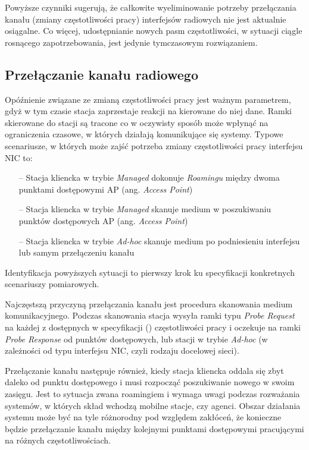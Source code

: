 Powyższe czynniki sugerują, że całkowite wyeliminowanie potrzeby przełączania kanału (zmiany częstotliwości pracy) interfejsów radiowych nie jest aktualnie osiągalne. Co więcej, udostępnianie nowych pasm częstotliwości, w sytuacji ciągle rosnącego zapotrzebowania, jest jedynie tymczasowym rozwiązaniem.  


\subsection{Przełączanie kanału radiowego}
Opóźnienie związane ze zmianą częstotliwości pracy jest ważnym parametrem, gdyż w tym czasie stacja zaprzestaje reakcji na kierowane do niej dane. Ramki skierowane do stacji są tracone co w oczywisty sposób może wpłynąć na ograniczenia czasowe, w których działają komunikujące się systemy. 
Typowe scenariusze, w których może zajść potrzeba zmiany częstotliwości pracy interfejsu NIC to:
\begin{itemize}
\item[--] Stacja kliencka w trybie \emph{Managed} dokonuje \emph{Roamingu} między dwoma punktami dostępowymi AP (ang. \emph{Access Point}) 
\item[--] Stacja kliencka w trybie \emph{Managed} skanuje medium w poszukiwaniu punktów dostępowych AP (ang. \emph{Access Point})
\item[--] Stacja kliencka w trybie \emph{Ad-hoc} skanuje medium po podniesieniu interfejsu lub samym przełączeniu kanału 
\end{itemize}
Identyfikacja powyższych sytuacji to pierwszy krok ku specyfikacji konkretnych scenariuszy pomiarowych. 

Najczęstszą przyczyną przełączania kanału jest procedura skanowania medium komunikacyjnego. Podczas skanowania stacja wysyła ramki typu \emph{Probe Request} na każdej z dostępnych w specyfikacji (\cite{std:IEEE80211}) częstotliwości pracy i oczekuje na ramki \emph{Probe Response} od punktów dostępowych, lub stacji w trybie \emph{Ad-hoc} (w zależności od typu interfejsu NIC, czyli rodzaju docelowej sieci).

Przełączanie kanału następuje również, kiedy stacja kliencka oddala się zbyt daleko od punktu dostępowego i musi rozpocząć poszukiwanie nowego w swoim zasięgu. Jest to sytuacja zwana roamingiem i wymaga uwagi podczas rozważania systemów, w których skład wchodzą mobilne stacje, czy agenci. Obszar działania systemu może być na tyle różnorodny pod względem zakłóceń, że konieczne będzie przełączanie kanału między kolejnymi punktami dostępowymi pracującymi na różnych częstotliwościach.

